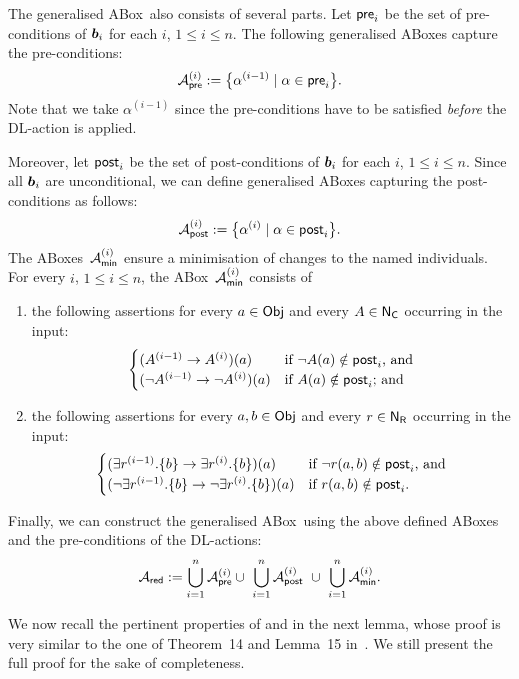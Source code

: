 The generalised ABox~\Ared also consists of several parts.  Let $\mathsf{pre}_i$ be the
set of pre-conditions of $\boldsymbol b_i$ for each $i$, $1\le i\le n$.  The following
generalised ABoxes capture the pre-conditions:
\[\mathcal{A}_\mathsf{pre}^{(i)}:=\bigl\{\alpha^{(i-1)}\mid\alpha\in\mathsf{pre}_i\bigr\}.\]
Note that we take $\alpha^{(i-1)}$ since the pre-conditions have to be satisfied
\emph{before} the DL-action is applied.

Moreover, let $\mathsf{post}_i$ be the set of post-conditions of $\boldsymbol b_i$ for each $i$,
$1\le i\le n$.  Since all $\boldsymbol b_i$ are unconditional, we can define generalised
ABoxes capturing the post-conditions as follows:
\[\mathcal{A}_\mathsf{post}^{(i)}:=\bigl\{\alpha^{(i)}\mid\alpha\in\mathsf{post}_i\bigr\}.\]
%
The ABoxes~$\mathcal{A}_\mathsf{min}^{(i)}$ ensure a minimisation of changes to the named
individuals.  For every $i$, $1\le i\le n$, the ABox~$\mathcal{A}_\mathsf{min}^{(i)}$ consists of
\begin{enumerate}
    \item the following assertions for every $a\in\mathsf{Obj}$ and every $A\in\mathsf{N_C}$
        occurring in the input:
        \[\begin{cases}
            (A^{(i-1)}\to A^{(i)})(a)
                &\text{if $\lnot A(a)\notin\mathsf{post}_i$, and}\\
            (\lnot A^{(i-1)}\to\lnot A^{(i)})(a)
                &\text{if $A(a)\notin\mathsf{post}_i$; and}
        \end{cases}\]
    \item the following assertions for every $a,b\in\mathsf{Obj}$ and every $r\in\mathsf{N_R}$
        occurring in the input:
        \[\begin{cases}
            (\exists r^{(i-1)}.\{b\}\to\exists r^{(i)}.\{b\})(a)
                &\text{if $\lnot r(a,b)\notin\mathsf{post}_i$, and}\\
            (\lnot\exists r^{(i-1)}.\{b\}\to\lnot\exists r^{(i)}.\{b\})(a)
                &\text{if $r(a,b)\notin\mathsf{post}_i$.}
        \end{cases}\]
\end{enumerate}

Finally, we can construct the generalised ABox~\Ared using the above defined
ABoxes and the pre-conditions of the DL-actions:
\[\Ared:=\bigcup_{i=1}^n\Apre^{(i)}\cup\ \bigcup_{i=1}^n\Apost^{(i)}\ \cup\ \bigcup_{i=1}^n\Amin^{(i)}.\]

We now recall the pertinent properties of \Tred and \Ared in the next lemma,
whose proof is very similar to the one of Theorem~14 and Lemma~15
in~\cite{BLM+-LTCS-05-02}.  We still present the full proof for the sake of
completeness.

